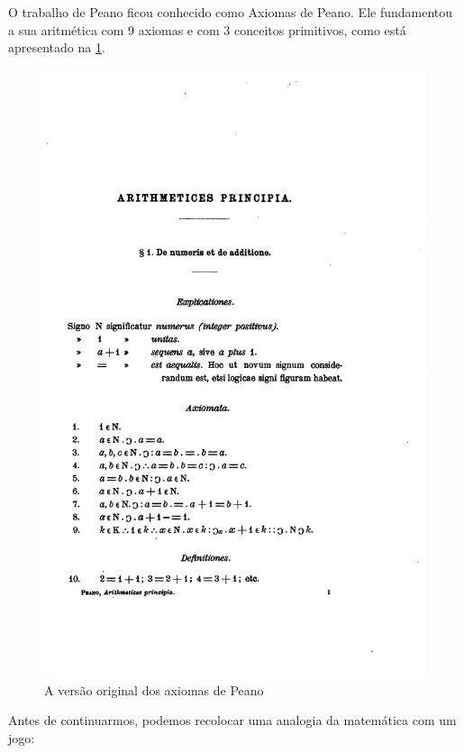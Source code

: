 \documentclass[../main.tex]{subfiles}
\begin{document}
O trabalho de Peano ficou conhecido como Axiomas de Peano. Ele fundamentou a sua aritmética com 9 axiomas e com 3 conceitos primitivos, como está apresentado na \cref{fig:axiomas-peano}.
\begin{figure}
    \begin{center}
        \includegraphics{../include/peano_axioms_original}
        \caption{A versão original dos axiomas de Peano}\label{fig:axiomas-peano}
    \end{center}  
\end{figure}

Antes de continuarmos, podemos recolocar uma analogia da matemática com um jogo:
\end{document}

